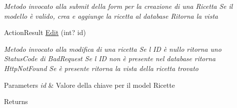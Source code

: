 \begin{DoxyCompactItemize}
\begin{DoxyCompactList}\small\item\em Metodo invocato alla submit della form per la creazione di una Ricetta Se il modello è valido, crea e aggiunge la ricetta al database Ritorna la vista \end{DoxyCompactList}\item 
Action\+Result \mbox{\hyperlink{class_brew_day2_1_1_controllers_1_1_ricette_controller_a3e04796b2bacf85d21c27df282326a30}{Edit}} (int? id)
\begin{DoxyCompactList}\small\item\em Metodo invocato alla modifica di una ricetta Se l\textquotesingle{} ID è nullo ritorna uno Status\+Code di Bad\+Request Se l\textquotesingle{} ID non è presente nel database ritorna Http\+Not\+Found Se è presente ritorna la vista della ricetta trovato 
\begin{DoxyParams}{Parameters}
{\em id} & Valore della chiave per il model Ricette\\
\hline
\end{DoxyParams}
\begin{DoxyReturn}{Returns}


\end{DoxyReturn}
\end{DoxyCompactList}
\end{DoxyCompactItemize}
